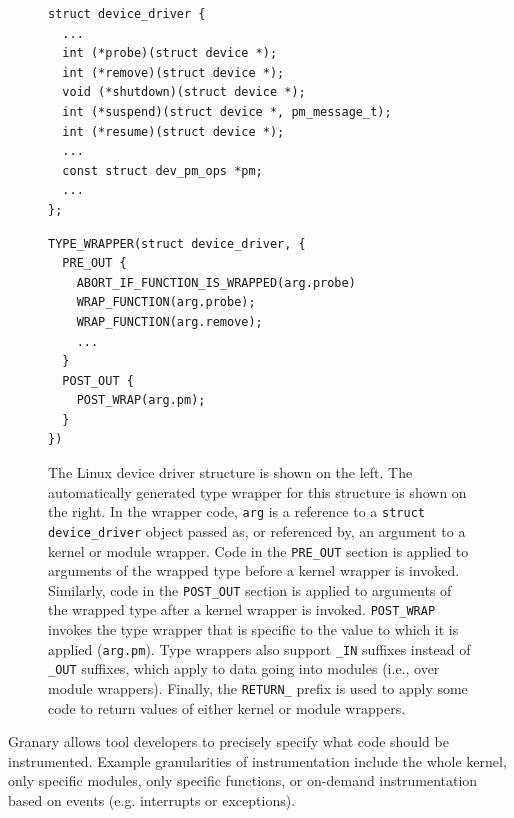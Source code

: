 \documentclass[preprint]{sigplanconf}
\begin{document}
\begin{figure}[ht!]
\lstset{language=C, tabsize=2, stepnumber=1}
\begin{multicols}{2}
\begin{lstlisting}[basicstyle=\footnotesize\ttfamily]
struct device_driver {
  ...
  int (*probe)(struct device *);
  int (*remove)(struct device *);
  void (*shutdown)(struct device *);
  int (*suspend)(struct device *, pm_message_t);
  int (*resume)(struct device *);
  ...
  const struct dev_pm_ops *pm;
  ...
};
\end{lstlisting}
\columnbreak
\begin{lstlisting}[basicstyle=\footnotesize\ttfamily]
TYPE_WRAPPER(struct device_driver, {
  PRE_OUT {
    ABORT_IF_FUNCTION_IS_WRAPPED(arg.probe)
    WRAP_FUNCTION(arg.probe);
    WRAP_FUNCTION(arg.remove);
    ...
  }
  POST_OUT {
    POST_WRAP(arg.pm);
  }
})
\end{lstlisting}
\end{multicols}
\caption{The Linux device driver structure is shown on the left. The automatically generated type wrapper for this structure is shown on the right. In the wrapper code, \texttt{arg} is a reference to a \texttt{struct device\_driver} object passed as, or referenced by, an argument to a kernel or module wrapper. Code in the \texttt{PRE\_OUT} section is applied to arguments of the wrapped type before a kernel wrapper is invoked. Similarly, code in the \texttt{POST\_OUT} section is applied to arguments of the wrapped type after a kernel wrapper is invoked. \texttt{POST\_WRAP} invokes the type wrapper that is specific to the value to which it is applied (\texttt{arg.pm}). Type wrappers also support \texttt{\_IN} suffixes instead of \texttt{\_OUT} suffixes, which apply to data going into modules (i.e., over module wrappers). Finally, the \texttt{RETURN\_} prefix is used to apply some code to return values of either kernel or module wrappers.}
\label{fig:type_wrapper}
\end{figure}

Granary allows tool developers to precisely specify what code should be instrumented. Example granularities of instrumentation include the whole kernel, only specific modules, only specific functions, or on-demand instrumentation based on events (e.g. interrupts or exceptions).
\end{document}
